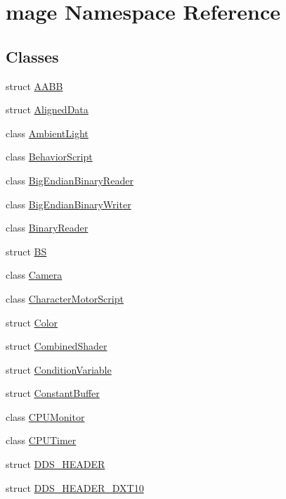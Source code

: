 \hypertarget{namespacemage}{}\section{mage Namespace Reference}
\label{namespacemage}
\subsection*{Classes}
\begin{DoxyCompactItemize}
\item 
struct \hyperlink{structmage_1_1_a_a_b_b}{A\+A\+BB}
\item 
struct \hyperlink{structmage_1_1_aligned_data}{Aligned\+Data}
\item 
class \hyperlink{classmage_1_1_ambient_light}{Ambient\+Light}
\item 
class \hyperlink{classmage_1_1_behavior_script}{Behavior\+Script}
\item 
class \hyperlink{classmage_1_1_big_endian_binary_reader}{Big\+Endian\+Binary\+Reader}
\item 
class \hyperlink{classmage_1_1_big_endian_binary_writer}{Big\+Endian\+Binary\+Writer}
\item 
class \hyperlink{classmage_1_1_binary_reader}{Binary\+Reader}
\item 
struct \hyperlink{structmage_1_1_b_s}{BS}
\item 
class \hyperlink{classmage_1_1_camera}{Camera}
\item 
class \hyperlink{classmage_1_1_character_motor_script}{Character\+Motor\+Script}
\item 
struct \hyperlink{structmage_1_1_color}{Color}
\item 
struct \hyperlink{structmage_1_1_combined_shader}{Combined\+Shader}
\item 
struct \hyperlink{structmage_1_1_condition_variable}{Condition\+Variable}
\item 
struct \hyperlink{structmage_1_1_constant_buffer}{Constant\+Buffer}
\item 
class \hyperlink{classmage_1_1_c_p_u_monitor}{C\+P\+U\+Monitor}
\item 
class \hyperlink{classmage_1_1_c_p_u_timer}{C\+P\+U\+Timer}
\item 
struct \hyperlink{structmage_1_1_d_d_s___h_e_a_d_e_r}{D\+D\+S\+\_\+\+H\+E\+A\+D\+ER}
\item 
struct \hyperlink{structmage_1_1_d_d_s___h_e_a_d_e_r___d_x_t10}{D\+D\+S\+\_\+\+H\+E\+A\+D\+E\+R\+\_\+\+D\+X\+T10}
\item 

\end{DoxyCompactItemize}
